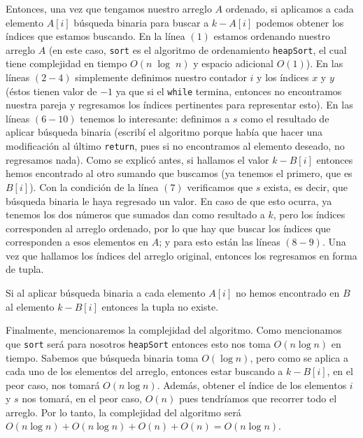 \documentclass[letterpaper,11pt]{article}
\begin{document}
\begin{enumerate}
    Entonces, una vez que tengamos nuestro arreglo $A$ ordenado, si aplicamos 
    a cada elemento $A[i]$ búsqueda binaria para buscar a $k - A[i]$ podemos 
    obtener los índices que estamos buscando. En la línea $(1)$ estamos 
    ordenando nuestro arreglo $A$ (en este caso, \texttt{sort} es el 
    algoritmo de ordenamiento \texttt{heapSort}, el cual tiene complejidad 
    en tiempo $O(n \; \log \; n)$ y espacio adicional $O(1)$). En las 
    líneas $(2 - 4)$ simplemente definimos nuestro contador $i$ y los índices 
    $x$ y $y$ (éstos tienen valor de $-1$ ya que si el \texttt{while} 
    termina, entonces no encontramos nuestra pareja y regresamos los 
    índices pertinentes para representar esto). En las líneas $(6 - 10)$
    tenemos lo interesante: definimos a $s$ como el resultado de aplicar 
    búsqueda binaria (escribí el algoritmo porque había que hacer una 
    modificación al último \texttt{return}, pues si no encontramos al 
    elemento deseado, no regresamos nada). Como se explicó antes, si 
    hallamos el valor $k - B[i]$ entonces hemos encontrado al otro sumando 
    que buscamos (ya tenemos el primero, que es $B[i]$). Con la condición 
    de la línea $(7)$ verificamos que $s$ exista, es decir, que búsqueda 
    binaria le haya regresado un valor. En caso de que esto ocurra, ya 
    tenemos los dos números que sumados dan como resultado a $k$, pero los 
    índices corresponden al arreglo ordenado, por lo que hay que buscar 
    los índices que corresponden a esos elementos en $A$; y para esto 
    están las líneas $(8 - 9)$. Una vez que hallamos los índices del 
    arreglo original, entonces los regresamos en forma de tupla.

    Si al aplicar búsqueda binaria a cada elemento $A[i]$ no hemos encontrado 
    en $B$ al elemento $k - B[i]$ entonces la tupla no existe. 

    Finalmente, mencionaremos la complejidad del algoritmo. Como mencionamos 
    que \texttt{sort} será para nosotros \texttt{heapSort} entonces esto nos
    toma $O(n \log n)$ en tiempo. Sabemos que búsqueda binaria toma 
    $O(\log n)$, pero como se aplica a cada uno de los elementos del arreglo, 
    entonces estar buscando a $k - B[i]$, en el peor caso, nos tomará 
    $O(n \log n)$. Además, obtener el índice de los elementos $i$ y $s$ nos 
    tomará, en el peor caso, $O(n)$ pues tendríamos que recorrer todo el 
    arreglo. Por lo tanto, la complejidad del algoritmo será 
    $O(n \log n) + O(n \log n) + O(n) + O(n) = O(n \log n)$. 
        

\end{enumerate}
\end{document}
